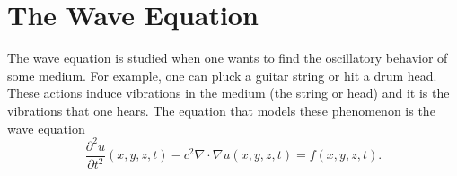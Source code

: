 
        \section{The Wave Equation}
        The wave equation is studied when one wants to find the oscillatory behavior of some medium.  For example, one can pluck a guitar string or hit a drum head.  These actions induce vibrations in the medium (the string or head) and it is the vibrations that one hears.  The equation that models these phenomenon is the wave equation
        \[
        \frac{\partial^2 u}{\partial t^2}(x,y,z,t)-c^2 \nabla \cdot \nabla u(x,y,z,t)=f(x,y,z,t).
        \]
        

